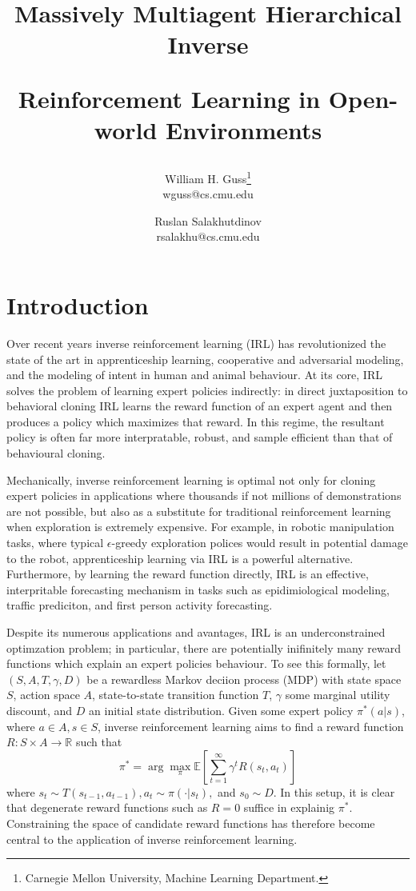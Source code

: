 \documentclass[11pt]{article}
\title{
 \begin{minipage}[c]{1.05\textwidth}
 	\centerline{Massively Multiagent Hierarchical Inverse}
 	\centerline{Reinforcement Learning in Open-world Environments}
 \end{minipage}
}
\author{
	\vspace{1cm}
	William H. Guss\thanks{Carnegie Mellon University, Machine Learning Department.}\\[-1cm]
	wguss@cs.cmu.edu \and
	Ruslan Salakhutdinov\footnotemark[1] \\
	rsalakhu@cs.cmu.edu
}
\begin{document}
\maketitle
\thispagestyle{empty}


\setcounter{page}{1}


\section{Introduction}

Over recent years inverse reinforcement learning (IRL) has revolutionized the state of the art in apprenticeship learning, cooperative and adversarial modeling, and the modeling of intent in human and animal behaviour. At its core, IRL solves the problem of learning expert policies indirectly: in direct juxtaposition to behavioral cloning IRL learns the reward function of an expert agent and then produces a policy which maximizes that reward. In this regime, the resultant policy is often far more interpratable, robust, and sample efficient than that of behavioural cloning. 

Mechanically, inverse reinforcement learning is optimal not only for cloning expert policies in applications where thousands if not millions of demonstrations are not possible, but also as a substitute for traditional reinforcement learning when exploration is extremely expensive. For example, in robotic manipulation tasks, where typical $\epsilon$-greedy exploration polices would result in potential damage to the robot, apprenticeship learning via IRL is a powerful alternative. Furthermore, by learning the reward function directly, IRL is an effective, interpritable forecasting mechanism in tasks such as epidimiological modeling, traffic prediciton, and first person activity forecasting.


Despite its numerous applications and avantages, IRL is an underconstrained optimzation problem; in particular, there are potentially inifinitely many reward functions which explain an expert policies behaviour. To see this formally, let $(S,A,T,\gamma,D)$ be a rewardless Markov deciion process (MDP) with state space $S$, action space $A$, state-to-state transition function $T$, $\gamma$ some marginal utility discount, and $D$ an initial state distribution. Given some expert policy $\pi^*(a | s )$, where $a \in A, s \in S$, inverse reinforcement learning aims to find a reward function $R: S \times A \to \mathbb{R}$ such that 
\begin{equation}
	\pi^* = \arg \max_{\pi} \mathbb{E}\left[\sum_{t=1}^\infty \gamma^t  R(s_t, a_t)\right]
\end{equation}
where $s_t \sim T(s_{t-1}, a_{t-1}), a_t \sim \pi(\cdot | s_t),$ and $s_0 \sim D.$ In this setup, it is clear that degenerate reward functions such as $R = 0$ suffice in explainig $\pi^*.$ Constraining the space of candidate reward functions has therefore become central to the application of inverse reinforcement learning. 
\end{document}
